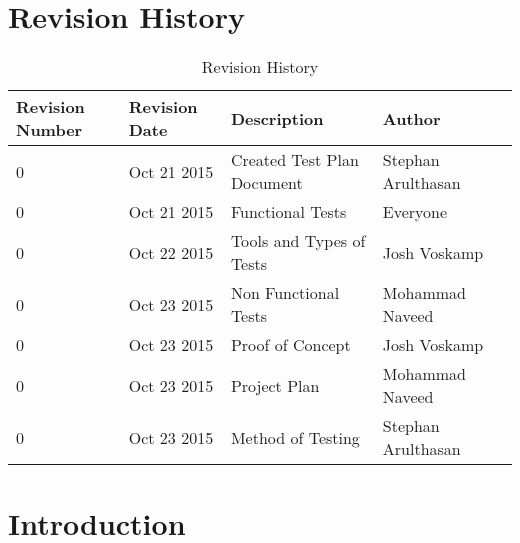 \documentclass[12pt]{article}
\begin{document}
\begin{titlepage}

 

\vfill %

\end{titlepage}

\newpage
\tableofcontents
\newpage
\listoftables
{}
\newpage
\listoffigures
{}
\newpage

\section*{Revision History}
\begin{table}[!htbp]
	\centering
    \begin{tabular}{ | p{2cm} | l| l | l |p{3cm}|}
    \hline
    Revision Number & Revision Date & Description & Author \\ \hline
    0 & Oct 21 2015 & Created Test Plan Document & Stephan Arulthasan \\ \hline
    0 & Oct 21 2015 & Functional Tests & Everyone \\ \hline
    0 & Oct 22 2015 & Tools and Types of Tests & Josh Voskamp \\ \hline
    0 & Oct 23 2015 & Non Functional Tests & Mohammad Naveed \\ \hline
    0 & Oct 23 2015 & Proof of Concept & Josh Voskamp \\ \hline
    0 & Oct 23 2015 & Project Plan & Mohammad Naveed \\ \hline
    0 & Oct 23 2015 & Method of Testing & Stephan Arulthasan \\ \hline
    
    \end{tabular}
    \caption{Revision History}
\end{table}


\newpage

\section{Introduction}
\end{document}
